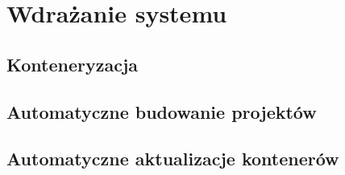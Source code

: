 \chapter{Wdrażanie systemu}

\section{Konteneryzacja}
\section{Automatyczne budowanie projektów}
\section{Automatyczne aktualizacje kontenerów}

